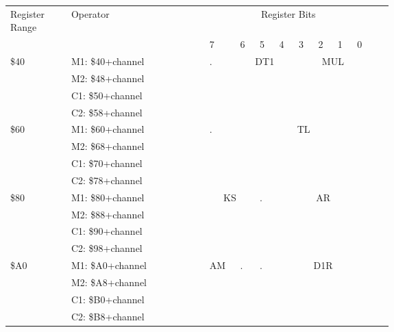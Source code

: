 \begin{longtable}{|m{0.10\linewidth}|m{0.25\linewidth}|p{0.033\linewidth}|p{0.033\linewidth}|p{0.033\linewidth}|p{0.033\linewidth}|p{0.033\linewidth}|p{0.033\linewidth}|p{0.033\linewidth}|p{0.033\linewidth}|p{0.033\linewidth}|}
	\hline

	\multirowcell{2}{Register\\Range} & \multirow{2}{*}{Operator} & \multicolumn{8}{c|}{Register Bits} \\\cline{3-10}
	& & 7 & 6 & 5 & 4 & 3 & 2 & 1 & 0 \\ \hline

	\multirow{4}{*}{\$40} & M1: \$40+channel &
	\multirow{4}{*}{.} &
	\multicolumn{3}{c|}{\multirow{4}{*}{DT1}} &
	\multicolumn{4}{c|}{\multirow{4}{*}{MUL}} \\
	& M2: \$48+channel & & \multicolumn{3}{c|}{} & \multicolumn{4}{c|}{} \\
	& C1: \$50+channel & & \multicolumn{3}{c|}{} & \multicolumn{4}{c|}{} \\
	& C2: \$58+channel & & \multicolumn{3}{c|}{} & \multicolumn{4}{c|}{} \\\hline

	\multirow{4}{*}{\$60} & M1: \$60+channel &
	\multirow{4}{*}{.} &
	\multicolumn{7}{c|}{\multirow{4}{*}{TL}} \\
	& M2: \$68+channel & & \multicolumn{7}{c|}{} \\
	& C1: \$70+channel & & \multicolumn{7}{c|}{} \\
	& C2: \$78+channel & & \multicolumn{7}{c|}{} \\\hline

	\multirow{4}{*}{\$80} & M1: \$80+channel &
	\multicolumn{2}{c|}{\multirow{4}{*}{KS}} &
	\multirow{4}{*}{.} &
	\multicolumn{5}{c|}{\multirow{4}{*}{AR}} \\
	& M2: \$88+channel & \multicolumn{2}{c|}{} & & \multicolumn{5}{c|}{}\\
	& C1: \$90+channel & \multicolumn{2}{c|}{} & & \multicolumn{5}{c|}{}\\
	& C2: \$98+channel & \multicolumn{2}{c|}{} & & \multicolumn{5}{c|}{}\\\hline

	\multirow{4}{*}{\$A0} & M1: \$A0+channel &
	\multirow{4}{*}{AM} &
	\multirow{4}{*}{.} &
	\multirow{4}{*}{.} &
	\multicolumn{5}{c|}{\multirow{4}{*}{D1R}} \\
	& M2: \$A8+channel & & & & \multicolumn{5}{c|}{}\\
	& C1: \$B0+channel & & & & \multicolumn{5}{c|}{}\\
	& C2: \$B8+channel & & & & \multicolumn{5}{c|}{}\\\hline


\end{longtable}
